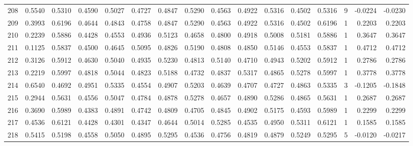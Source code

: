 \begin{tabular}{lrrrrrrrrrrrrrrr}
208 &      0.5540 &  0.5310 &  0.4590 &  0.5027 &  0.4727 &  0.4847 &  0.5290 &  0.4563 &  0.4922 &  0.5316 &   0.4502 &     0.5316 &      9 &                   -0.0224 &                    -0.0230 \\
209 &      0.3993 &  0.6196 &  0.4644 &  0.4843 &  0.4758 &  0.4847 &  0.5290 &  0.4563 &  0.4922 &  0.5316 &   0.4502 &     0.6196 &      1 &                    0.2203 &                     0.2203 \\
210 &      0.2239 &  0.5886 &  0.4428 &  0.4553 &  0.4936 &  0.5123 &  0.4658 &  0.4800 &  0.4918 &  0.5008 &   0.5181 &     0.5886 &      1 &                    0.3647 &                     0.3647 \\
211 &      0.1125 &  0.5837 &  0.4500 &  0.4645 &  0.5095 &  0.4826 &  0.5190 &  0.4808 &  0.4850 &  0.5146 &   0.4553 &     0.5837 &      1 &                    0.4712 &                     0.4712 \\
212 &      0.3126 &  0.5912 &  0.4630 &  0.5040 &  0.4935 &  0.5230 &  0.4813 &  0.5140 &  0.4710 &  0.4943 &   0.5202 &     0.5912 &      1 &                    0.2786 &                     0.2786 \\
213 &      0.2219 &  0.5997 &  0.4818 &  0.5044 &  0.4823 &  0.5188 &  0.4732 &  0.4837 &  0.5317 &  0.4865 &   0.5278 &     0.5997 &      1 &                    0.3778 &                     0.3778 \\
214 &      0.6540 &  0.4692 &  0.4951 &  0.5335 &  0.4554 &  0.4907 &  0.5203 &  0.4639 &  0.4707 &  0.4727 &   0.4863 &     0.5335 &      3 &                   -0.1205 &                    -0.1848 \\
215 &      0.2944 &  0.5631 &  0.4556 &  0.5047 &  0.4784 &  0.4878 &  0.5278 &  0.4657 &  0.4890 &  0.5286 &   0.4865 &     0.5631 &      1 &                    0.2687 &                     0.2687 \\
216 &      0.3690 &  0.5989 &  0.4383 &  0.4891 &  0.4742 &  0.4809 &  0.4705 &  0.4845 &  0.4902 &  0.5175 &   0.4593 &     0.5989 &      1 &                    0.2299 &                     0.2299 \\
217 &      0.4536 &  0.6121 &  0.4428 &  0.4301 &  0.4347 &  0.4644 &  0.5014 &  0.5285 &  0.4535 &  0.4950 &   0.5311 &     0.6121 &      1 &                    0.1585 &                     0.1585 \\
218 &      0.5415 &  0.5198 &  0.4558 &  0.5050 &  0.4895 &  0.5295 &  0.4536 &  0.4756 &  0.4819 &  0.4879 &   0.5249 &     0.5295 &      5 &                   -0.0120 &                    -0.0217 \\

\end{tabular}
